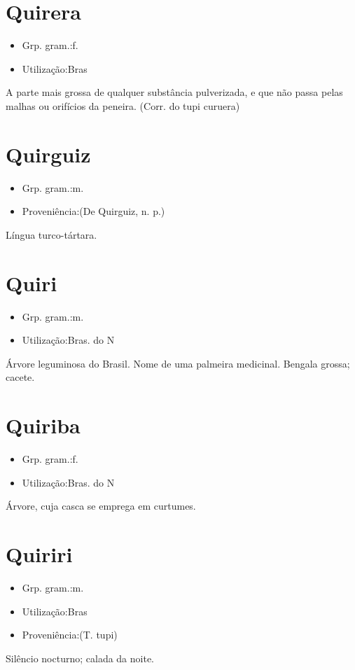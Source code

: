 \section{Quirera}
\begin{itemize}
\item {Grp. gram.:f.}
\end{itemize}
\begin{itemize}
\item {Utilização:Bras}
\end{itemize}
A parte mais grossa de qualquer substância pulverizada, e que não passa pelas malhas ou orifícios da peneira.
(Corr. do tupi \textunderscore curuera\textunderscore )
\section{Quirguiz}
\begin{itemize}
\item {Grp. gram.:m.}
\end{itemize}
\begin{itemize}
\item {Proveniência:(De \textunderscore Quirguiz\textunderscore , n. p.)}
\end{itemize}
Língua turco-tártara.
\section{Quiri}
\begin{itemize}
\item {Grp. gram.:m.}
\end{itemize}
\begin{itemize}
\item {Utilização:Bras. do N}
\end{itemize}
Árvore leguminosa do Brasil.
Nome de uma palmeira medicinal.
Bengala grossa; cacete.
\section{Quiriba}
\begin{itemize}
\item {Grp. gram.:f.}
\end{itemize}
\begin{itemize}
\item {Utilização:Bras. do N}
\end{itemize}
Árvore, cuja casca se emprega em curtumes.
\section{Quiriri}
\begin{itemize}
\item {Grp. gram.:m.}
\end{itemize}
\begin{itemize}
\item {Utilização:Bras}
\end{itemize}
\begin{itemize}
\item {Proveniência:(T. tupi)}
\end{itemize}
Silêncio nocturno; calada da noite.
